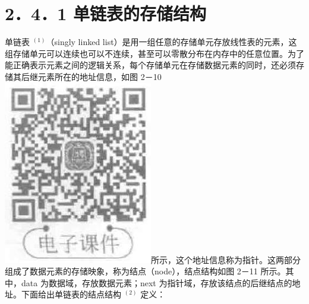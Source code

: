 \documentclass[10pt]{article}
\begin{document}
\section*{2．4．1 单链表的存储结构}
单链表 ${ }^{(1)}$（singly linked list）是用一组任意的存储单元存放线性表的元素，这组存储单元可以连续也可以不连续，甚至可以零散分布在内存中的任意位置。为了能正确表示元素之间的逻辑关系，每个存储单元在存储数据元素的同时，还必须存储其后继元素所在的地址信息，如图 2－10\\
\includegraphics[max width=\textwidth]{2025_06_06_704745ea57b15b2333e5g-051(2)}所示，这个地址信息称为指针。这两部分组成了数据元素的存储映象，称为结点（node），结点结构如图 2－11 所示。其中，data 为数据域，存放数据元素；next 为指针域，存放该结点的后继结点的地址。下面给出单链表的结点结构 ${ }^{(2)}$ 定义：\\
\end{document}
